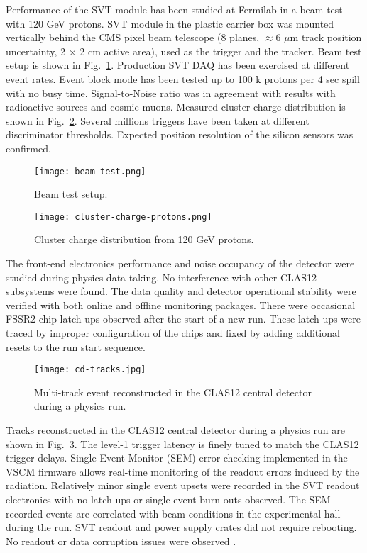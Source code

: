 Performance of the SVT module has been studied at Fermilab in a beam test with 120 GeV protons. SVT module in the plastic carrier box was mounted vertically behind the CMS pixel beam telescope (8 planes, $\approx$6 $\mu$m track position uncertainty, 2 $\times$ 2 cm active area), used as the trigger and the tracker. Beam test setup is shown in Fig.~\ref{fig:beam-test}. Production SVT DAQ has been exercised at different event rates. Event block mode has been tested up to 100 k protons per 4 sec spill with no busy time. Signal-to-Noise ratio was in agreement with results with radioactive sources and cosmic muons. Measured cluster charge distribution is shown in Fig.~\ref{fig:cluster-charge-protons}. Several millions triggers have been taken at different discriminator thresholds.  Expected position resolution of the silicon sensors was confirmed. 

\begin{figure}[hbt] 
\centering 
\texttt{[image: beam-test.png]}
\caption{Beam test setup.}
\label{fig:beam-test}
\end{figure}

\begin{figure}[h] 
\centering 
\texttt{[image: cluster-charge-protons.png]}
\caption{Cluster charge distribution from 120 GeV protons.}
\label{fig:cluster-charge-protons}
\end{figure}

The front-end electronics performance and noise occupancy of the detector were studied during physics data taking. No interference with other CLAS12 subsystems were found. The data quality and detector operational stability  were verified with both online and offline monitoring packages. There were occasional FSSR2 chip latch-ups observed after the start of a new run. These latch-ups were traced by improper configuration of the chips and fixed by adding additional resets to the run start sequence.

\begin{figure}[h] 
\centering 
\texttt{[image: cd-tracks.jpg]}
\caption{Multi-track event reconstructed in the CLAS12 central detector during a physics run.}
\label{fig:cd-tracks}
\end{figure}

Tracks reconstructed in the CLAS12 central detector during a physics run are shown in Fig.~\ref{fig:cd-tracks}. The level-1 trigger latency is finely tuned to match the CLAS12 trigger delays. Single Event Monitor (SEM) error checking implemented in the VSCM firmware allows real-time monitoring of the readout errors induced by the radiation. Relatively minor single event upsets were recorded in the SVT readout electronics with no latch-ups or single event burn-outs observed. The SEM recorded events are correlated with beam conditions in the experimental hall during the run. SVT readout and power supply crates did not require rebooting. No readout or data corruption issues were observed \cite{SEENOTE}. 


